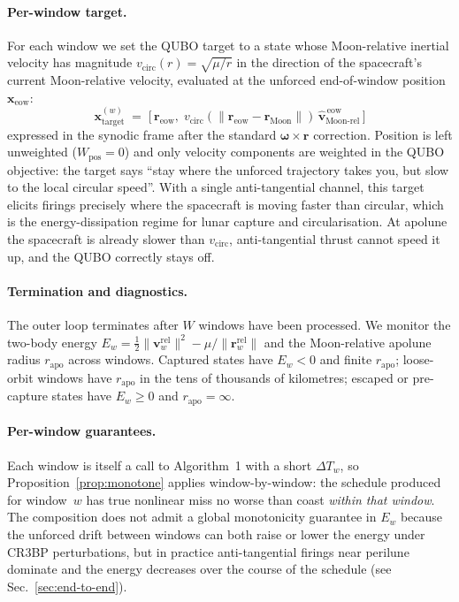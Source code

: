 \documentclass[11pt,a4paper]{article}
\theoremstyle{plain}
\newcommand{\bvec}[1]{\bm{#1}}
\newcommand{\xvec}{\bvec{x}}
\newcommand{\rvec}{\bvec{r}}
\begin{document}
\paragraph{Per-window target.} For each window we set the QUBO
target to a state whose Moon-relative inertial velocity has
magnitude $v_\mathrm{circ}(r) = \sqrt{\mu/r}$ in the direction of
the spacecraft's current Moon-relative velocity, evaluated at
the unforced end-of-window position $\xvec_\mathrm{eow}$:
\begin{equation}\label{eq:capture-target}
  \xvec_\mathrm{target}^{(w)}
  \;=\;
  \big[\,
    \rvec_\mathrm{eow},\;
    v_\mathrm{circ}(\|\rvec_\mathrm{eow} - \rvec_\mathrm{Moon}\|)\,
    \hat{\bvec{v}}_\mathrm{Moon\text{-}rel}^{\,\mathrm{eow}}
  \,\big]
\end{equation}
expressed in the synodic frame after the standard
$\bvec{\omega}\times\rvec$ correction. Position is left
unweighted ($W_\mathrm{pos} = 0$) and only velocity components
are weighted in the QUBO objective: the target says ``stay where
the unforced trajectory takes you, but slow to the local circular
speed''. With a single anti-tangential channel, this target
elicits firings precisely where the spacecraft is moving faster
than circular, which is the energy-dissipation regime for lunar capture and
circularisation. At apolune the spacecraft is already slower than
$v_\mathrm{circ}$, anti-tangential thrust cannot speed it up,
and the QUBO correctly stays off.

\paragraph{Termination and diagnostics.} The outer loop
terminates after $W$ windows have been processed. We monitor the
two-body energy $E_w = \tfrac{1}{2}\|\bvec{v}_w^\mathrm{rel}\|^2 -
\mu/\|\rvec_w^\mathrm{rel}\|$ and the Moon-relative apolune
radius $r_\mathrm{apo}$ across windows. Captured states have
$E_w < 0$ and finite $r_\mathrm{apo}$; loose-orbit windows have
$r_\mathrm{apo}$ in the tens of thousands of kilometres;
escaped or pre-capture states have $E_w \ge 0$ and
$r_\mathrm{apo} = \infty$.

\paragraph{Per-window guarantees.} Each window is itself a call to
Algorithm~1 with a short $\Delta T_w$, so
Proposition~\ref{prop:monotone} applies window-by-window: the
schedule produced for window~$w$ has true nonlinear miss no worse
than coast \emph{within that window}. The composition does not
admit a global monotonicity guarantee in $E_w$ because the
unforced drift between windows can both raise or lower the energy
under CR3BP perturbations, but in practice anti-tangential
firings near perilune dominate and the energy decreases over the
course of the schedule (see Sec.~\ref{sec:end-to-end}).
\end{document}
